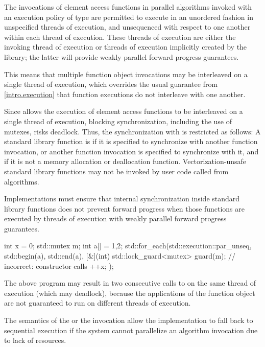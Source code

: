 \pnum
The invocations of element access functions in parallel algorithms invoked with
an execution policy of type  are
permitted to execute in an unordered fashion in unspecified threads of execution, and
unsequenced with respect to one another within each thread of execution.
These threads of execution are either the invoking thread of execution or threads of
execution implicitly created by the library; the latter will provide weakly parallel
forward progress guarantees.
\begin{note}
This means that multiple function object invocations may be interleaved on a
single thread of execution, which overrides the usual guarantee from \ref{intro.execution}
that function executions do not interleave with one another.
\end{note}
Since  allows the execution of element
access functions to be interleaved on a single thread of execution, blocking synchronization,
including the use of mutexes, risks deadlock. Thus, the synchronization with
 is restricted as
follows:
A standard library function is  if it is specified
to synchronize with another function invocation, or another function invocation
is specified to synchronize with it, and if it is not a memory allocation or
deallocation function. Vectorization-unsafe standard library functions may not
be invoked by user code called from 
algorithms.
\begin{note}
Implementations must ensure that internal synchronization inside standard
library functions does not prevent forward progress when those functions are
executed by threads of execution with weakly parallel forward progress guarantees.
\end{note}
\begin{example}
\begin{codeblock}
int x = 0;
std::mutex m;
int a[] = {1,2};
std::for_each(std::execution::par_unseq, std::begin(a), std::end(a), [&](int) {
  std::lock_guard<mutex> guard(m); // incorrect:  constructor calls 
  ++x;
});
\end{codeblock}
The above program may result in two consecutive calls to  on
the same thread of execution (which may deadlock), because the applications of the function
object are not guaranteed to run on different threads of execution.
\end{example}
\begin{note}
The semantics of the  or the
 invocation allow the implementation to
fall back to sequential execution if the system cannot parallelize an algorithm
invocation due to lack of resources.
\end{note}

